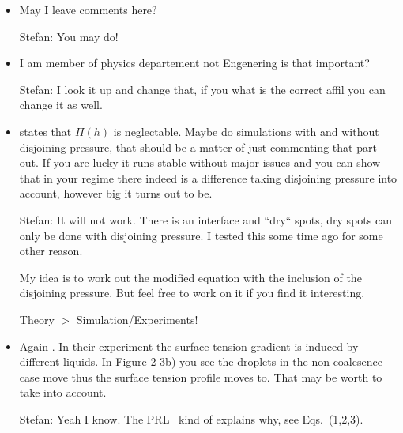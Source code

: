\documentclass[twocolumn,amsmath,amssymb,showpacs,pre,nofootinbib,superscriptaddress]{revtex4-1} %
\begin{document}
\begin{itemize}
    \item May I leave comments here?
    
    \textcolor{pyblue}{Stefan}: You may do!
    
    \item I am member of physics departement not Engenering is that important?
    
    \textcolor{pyblue}{Stefan}: I look it up and change that, if you what is the correct affil you can change it as well.
    
    \item \cite{doi:10.1021/la500459v} states that $\Pi(h)$ is neglectable. Maybe do simulations with and without disjoining pressure, that should be a matter of just commenting that part out. If you are lucky it runs stable without major issues and you can show that in your regime there indeed is a difference taking disjoining pressure into account, however big it turns out to be. 
    
    \textcolor{pyblue}{Stefan}: It will not work.
    There is an interface and ``dry`` spots, dry spots can only be done with disjoining pressure.
    I tested this some time ago for some other reason.
    
    My idea is to work out the modified equation with the inclusion of the disjoining pressure.
    But feel free to work on it if you find it interesting.
    
    Theory $>$ Simulation/Experiments!
    
    \item Again \cite{doi:10.1021/la500459v}. In their experiment the surface tension gradient is induced by different liquids. In Figure 2 3b) you see the droplets in the non-coalesence case move thus the surface tension profile moves to. That may be worth to take into account.
    
    \textcolor{pyblue}{Stefan}: Yeah I know.
    The PRL~\cite{PhysRevLett.109.066103} kind of explains why, see Eqs.~(1,2,3).
\end{itemize}

%



\end{document}
